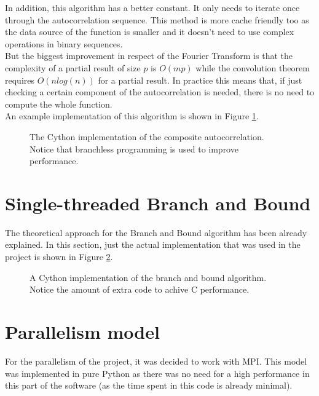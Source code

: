       In addition, this algorithm has a better constant. It only needs to
      iterate once through the autocorrelation sequence. This method is more
      cache friendly too as the data source of the function is smaller and it
      doesn't need to use complex operations in binary sequences.\\

      But the biggest improvement in respect of the Fourier Transform is that
      the complexity of a partial result of size $p$ is $O(mp)$ while the
      convolution theorem requires $O(nlog(n))$ for a partial result. In
      practice this means that, if just checking a certain component
      of the autocorrelation is needed, there is no need to compute the whole
      function.\\

      An example implementation of this algorithm is shown in Figure
      \ref{composite_auto:fig:1}.

      \begin{figure}[ht!]
        \caption{The Cython implementation of the composite autocorrelation.
        Notice that branchless programming is used to improve performance.}
        \label{composite_auto:fig:1}
      \end{figure}

  \section{Single-threaded Branch and Bound}

  The theoretical approach for the Branch and Bound algorithm has been already
  explained. In this section, just the actual implementation that was used
  in the project is shown in Figure \ref{composite_auto:fig:2}.

  \begin{figure}[ht!]
    \caption{A Cython implementation of the branch and bound algorithm. Notice
    the amount of extra code to achive C performance.}
    \label{composite_auto:fig:2}
  \end{figure}


  \section{Parallelism model}

  For the parallelism of the project, it was decided to work with MPI. This model
  was implemented in pure Python as there was no need for a high performance in
  this part of the software (as the time spent in this code is already
  minimal).\\


